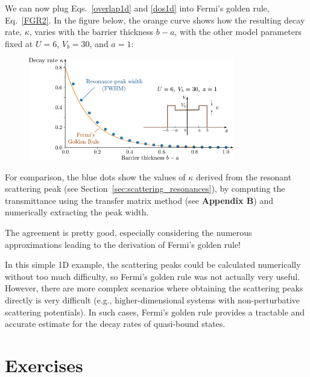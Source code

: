 \documentclass[pra,12pt]{revtex4}
\begin{document}
We can now plug Eqs.~\eqref{overlap1d} and \eqref{dos1d} into Fermi's
golden rule, Eq.~\eqref{FGR2}.  In the figure below, the orange curve
shows how the resulting decay rate, $\kappa$, varies with the barrier
thickness $b-a$, with the other model parameters fixed at $U = 6$,
$V_b = 30$, and $a = 1$:

\begin{figure}[h]
  \centering\includegraphics[width=0.8\textwidth]{goldenrule}
\end{figure}

\noindent
For comparison, the blue dots show the values of $\kappa$ derived from
the resonant scattering peak (see
Section~\ref{sec:scattering_resonances}), by computing the
transmittance using the transfer matrix method (see \textbf{Appendix
  B}) and numerically extracting the peak width.

The agreement is pretty good, especially considering the numerous
approximations leading to the derivation of Fermi's golden rule!

In this simple 1D example, the scattering peaks could be calculated
numerically without too much difficulty, so Fermi's golden rule was
not actually very useful.  However, there are more complex scenarios
where obtaining the scattering peaks directly is very difficult (e.g.,
higher-dimensional systems with non-perturbative scattering
potentials).  In such cases, Fermi's golden rule provides a tractable
and accurate estimate for the decay rates of quasi-bound states.

\section*{Exercises}
\end{document}
